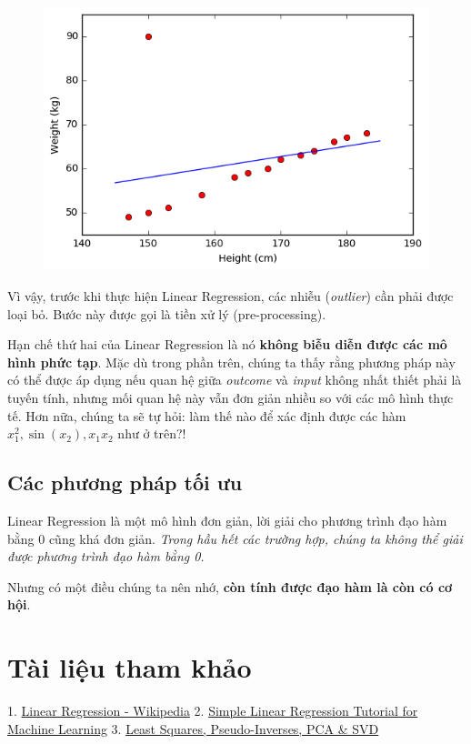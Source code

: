 \begin{figure}
 	\centering
 	\includegraphics[width = .6\textwidth]{../LR/output_13_1.png}
 \end{figure}
Vì vậy, trước khi thực hiện Linear Regression, các nhiễu (\textit{outlier}) cần 
 phải được loại bỏ. Bước này được gọi là tiền xử lý (pre-processing). 
 
Hạn chế thứ hai của Linear Regression là nó \textbf{không biễu diễn được các mô hình phức tạp}. Mặc dù trong phần trên, chúng ta thấy rằng phương pháp này có thể được áp dụng nếu quan hệ giữa \textit{outcome} và \textit{input} không nhất thiết phải là tuyến tính, nhưng mối quan hệ này vẫn đơn giản nhiều so với các mô hình thực tế. Hơn nữa, chúng ta sẽ tự hỏi: làm thế nào để xác định được các hàm $x_1^2, \sin(x_2), x_1x_2$ như ở trên?! 
 
 
\subsection{Các phương pháp tối ưu}
Linear Regression là một mô hình đơn giản, lời giải cho phương trình đạo hàm bằng 0 cũng khá đơn giản. \textit{Trong hầu hết các trường hợp, chúng ta không thể giải được phương trình đạo hàm bằng 0.} 
 
Nhưng có một điều chúng ta nên nhớ, \textbf{còn tính được đạo hàm là còn có cơ hội}. 
 
 
 
 
\section{Tài liệu tham khảo}
 
1. \href{https://en.wikipedia.org/wiki/Linear_regression}{Linear Regression - Wikipedia} 
2. \href{http://machinelearningmastery.com/simple-linear-regression-tutorial-for-machine-learning/}{Simple Linear Regression Tutorial for Machine Learning} 
3. \href{http://www.sci.utah.edu/~gerig/CS6640-F2012/Materials/pseudoinverse-cis61009sl10.pdf}{Least Squares, Pseudo-Inverses, PCA \& SVD} 
